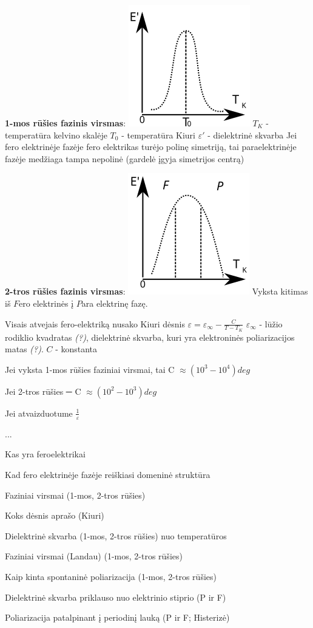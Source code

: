 \textbf{1-mos rūšies fazinis virsmas}:
\includegraphics[scale=1]{fero1.svg}
$T_K$ - temperatūra kelvino skalėje
$T_0$ - temperatūra Kiuri
$\varepsilon'$ - dielektrinė skvarba
Jei fero elektrinėje fazėje fero elektrikas turėjo polinę simetriją,
tai paraelektrinėje fazėje medžiaga tampa nepolinė
(gardelė įgyja simetrijos centrą)

\textbf{2-tros rūšies fazinis virsmas}:
\includegraphics[scale=1]{fero2.svg}
Vyksta kitimas iš $F$ero elektrinės į $P$ara elektrinę fazę.

Visais atvejais fero-elektriką nusako Kiuri dėsnis
$\varepsilon = \varepsilon_{\infty} - \frac{C}{T - T_K}$
$\varepsilon_{\infty}$ - lūžio rodiklio kvadratas \textit{(?)},
dielektrinė skvarba, kuri yra elektroninės poliarizacijos matas \textit{(?)}.
$C$ - konstanta

Jei vyksta 1-mos rūšies faziniai virsmai,
tai C $\approx (10^3 - 10^4) deg$

Jei 2-tros rūšies ─ C $\approx (10^2 - 10^3) deg$

Jei atvaizduotume $\frac{1}{\varepsilon}$

...

\begin{remember}
	\item Kas yra feroelektrikai
	\item Kad fero elektrinėje fazėje reiškiasi domeninė struktūra
	\item Faziniai virsmai (1-mos, 2-tros rūšies)
	\item Koks dėsnis aprašo (Kiuri)
	\item Dielektrinė skvarba (1-mos, 2-tros rūšies) nuo temperatūros
	\item Faziniai virsmai (Landau) (1-mos, 2-tros rūšies)
	\item Kaip kinta spontaninė poliarizacija (1-mos, 2-tros rūšies)
	\item Dielektrinė skvarba priklauso nuo elektrinio stiprio (P ir F)
	\item Poliarizacija patalpinant į periodinį lauką (P ir F; Histerizė)
\end{remember}

